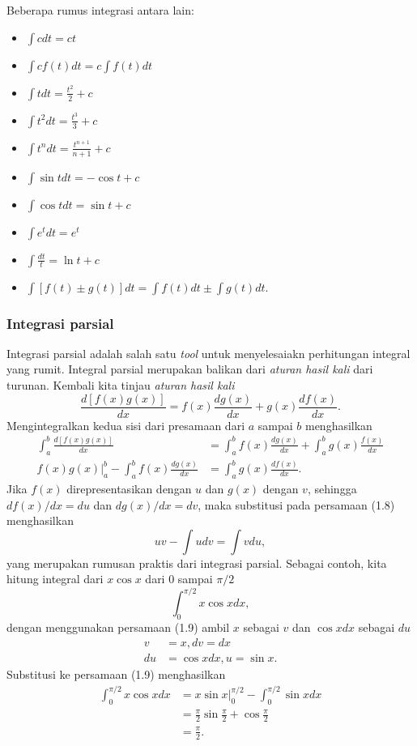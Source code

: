 Beberapa rumus integrasi antara lain:
\begin{itemize}
\item $\int cdt=ct$
\item $\int cf(t)dt=c\int f(t) dt$
\item $\int t dt=\frac{t^2}{2}+c$
\item $\int t^2dt=\frac{t^3}{3}+ c$
\item $\int t^ndt=\frac{t^{n+1}}{n+1}+c$
\item $\int \sin tdt=-\cos t+c$
\item $\int \cos tdt=\sin t+c$
\item $\int e^t dt=e^t$
\item $\int \frac{dt}{t}=\ln t+c$
\item $\int [f(t)\pm g(t)]dt=\int f(t) dt \pm \int g(t) dt$. 
\end{itemize}

\subsubsection{Integrasi parsial}
Integrasi parsial adalah salah satu \textit{tool} untuk menyelesaiakn perhitungan integral yang rumit. Integral parsial merupakan balikan dari \textit{aturan hasil kali} dari turunan. Kembali kita tinjau \textit{aturan hasil kali}
\[
\frac{d[f(x)g(x)]}{dx}=f(x)\frac{dg(x)}{dx}+g(x)\frac{df(x)}{dx}.
\]
Mengintegralkan kedua sisi dari presamaan dari $a$ sampai $b$ menghasilkan
\begin{align}
\int_a^b\frac{d[f(x)g(x)]}{dx}&=\int_a^bf(x)\frac{dg(x)}{dx}+\int_a^b g(x) \frac{f(x)}{dx}\\
f(x)g(x)\vert_a^b - \int_a^b f(x) \frac{dg(x)}{dx} &= \int_a^b g(x) \frac{df(x)}{dx}.
\end{align}
Jika $f(x)$ direpresentasikan dengan $u$ dan $g(x)$ dengan $v$, sehingga $df(x)/dx=du$ dan $dg(x)/dx=dv$, maka substitusi pada persamaan (1.8) menghasilkan
\begin{equation}
uv-\int udv = \int vdu,
\end{equation} 
yang merupakan rumusan praktis dari integrasi parsial. Sebagai contoh, kita hitung integral dari $x\cos x$ dari 0 sampai $\pi/2$
\[
\int_0^{\pi/2} x \cos x dx,
\]
dengan menggunakan persamaan (1.9) ambil $x$ sebagai $v$ dan $\cos x dx$ sebagai $du$
\begin{align*}
v&=x,  dv=dx\\
du&=\cos x dx,   u=\sin x.
\end{align*}  
Substitusi ke persamaan (1.9) menghasilkan
\begin{align*}
\int_0^{\pi /2} x \cos x dx&=x \sin x\vert_0^{\pi /2}-\int_0^{\pi /2} \sin x dx\\
&= \frac{\pi}{2} \sin \frac{\pi}{2}+\cos \frac{\pi}{2}\\
&=\frac{\pi}{2}.
\end{align*}

